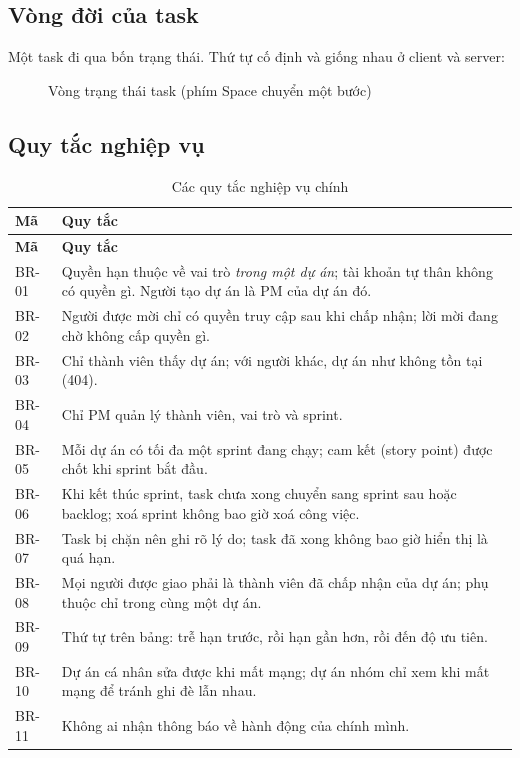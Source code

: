 \documentclass[../main.tex]{subfiles}
\begin{document}
\subsection{Vòng đời của task}
Một task đi qua bốn trạng thái. Thứ tự cố định và giống nhau ở client và server:
\begin{figure}[H]
\centering
{}
\caption{Vòng trạng thái task (phím Space chuyển một bước)}\label{fig:taskcycle}
\end{figure}

\subsection{Quy tắc nghiệp vụ}
\begin{longtable}{|p{1.3cm}|p{12.4cm}|}
\caption{Các quy tắc nghiệp vụ chính}\label{tab:rules}\\
\hline
\textbf{Mã} & \textbf{Quy tắc} \\ \hline
\endfirsthead
\hline
\textbf{Mã} & \textbf{Quy tắc} \\ \hline
\endhead
BR-01 & Quyền hạn thuộc về vai trò \emph{trong một dự án}; tài khoản tự thân không có quyền gì. Người tạo dự án là PM của dự án đó. \\ \hline
BR-02 & Người được mời chỉ có quyền truy cập sau khi chấp nhận; lời mời đang chờ không cấp quyền gì. \\ \hline
BR-03 & Chỉ thành viên thấy dự án; với người khác, dự án như không tồn tại (404). \\ \hline
BR-04 & Chỉ PM quản lý thành viên, vai trò và sprint. \\ \hline
BR-05 & Mỗi dự án có tối đa một sprint đang chạy; cam kết (story point) được chốt khi sprint bắt đầu. \\ \hline
BR-06 & Khi kết thúc sprint, task chưa xong chuyển sang sprint sau hoặc backlog; xoá sprint không bao giờ xoá công việc. \\ \hline
BR-07 & Task bị chặn nên ghi rõ lý do; task đã xong không bao giờ hiển thị là quá hạn. \\ \hline
BR-08 & Mọi người được giao phải là thành viên đã chấp nhận của dự án; phụ thuộc chỉ trong cùng một dự án. \\ \hline
BR-09 & Thứ tự trên bảng: trễ hạn trước, rồi hạn gần hơn, rồi đến độ ưu tiên. \\ \hline
BR-10 & Dự án cá nhân sửa được khi mất mạng; dự án nhóm chỉ xem khi mất mạng để tránh ghi đè lẫn nhau. \\ \hline
BR-11 & Không ai nhận thông báo về hành động của chính mình. \\ \hline
\end{longtable}
\end{document}
